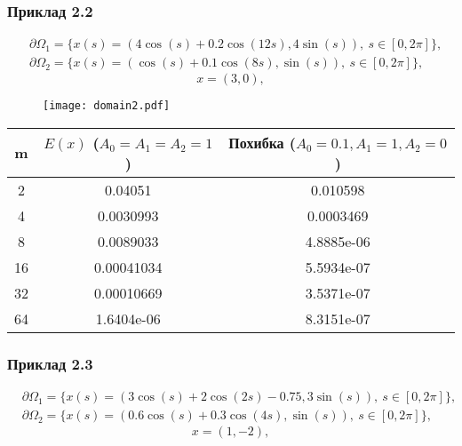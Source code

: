 \documentclass[12pt]{report}
\begin{document}
\subsubsection{Приклад 2.2}

 \begin{equation}
 \begin{split}
 	&\partial\Omega_1= \{x(s)=(4\cos(s) + 0.2\cos(12s),4\sin(s)),\ s\in[0,2\pi]\},\\
	&\partial\Omega_2= \{x(s)=(\cos(s) + 0.1 \cos(8s),\sin(s)),\ s\in[0,2\pi]\},
 \end{split}
 \end{equation}
 $$x=(3, 0),$$
 
 \begin{figure}[h!]
\centering
	\texttt{[image: domain2.pdf]}
	\vspace*{-1cm}
\end{figure}

\begin{center}
\begin{tabular}{ |c|c|c| } 
 \hline
 m & \shortstack{$E(x)$  \\  ($A_0=A_1=A_2=1$)}  & \shortstack{Похибка  \\  ($A_0=0.1, A_1= 1,A_2=0$)}  \\ 
 \hline
 2 & 0.04051 & 0.010598 \\ 
 4 & 0.0030993 & 0.0003469 \\ 
 8 & 0.0089033 & 4.8885e-06 \\ 
16 & 0.00041034 & 5.5934e-07 \\ 
32 & 0.00010669 & 3.5371e-07 \\ 
64 & 1.6404e-06 & 8.3151e-07 \\ 
 \hline
\end{tabular}
\end{center}

\subsubsection{Приклад 2.3}

 \begin{equation}
 \begin{split}
 	&\partial\Omega_1= \{x(s)=(3\cos(s) + 2\cos(2 s) -0.75,3\sin(s)),\ s\in[0,2\pi]\},\\
	&\partial\Omega_2= \{x(s)=(0.6\cos(s) + 0.3\cos(4s),\sin(s)),\ s\in[0,2\pi]\},
 \end{split}
 \end{equation}
  $$x=(1, -2),$$
 
\end{document}
